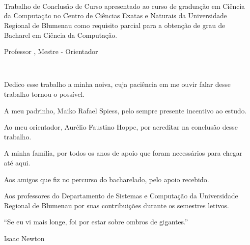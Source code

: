 \documentclass[notes.tex]{subfiles}
\renewcommand{\imprimircapa}{

    \DoubleSpacing

    \begin{centering}

        {\bfseries \MakeUppercase{\imprimirinstituicao}\par}
    
        \vspace*{\fill} \vspace*{\fill} \vspace*{\fill} \vspace*{\fill}
        \vspace*{\fill} \vspace*{\fill} \vspace*{\fill}
    
        \bfseries\LARGE\MakeUppercase{\imprimirtitulo}\\
    
        \vspace*{\fill}

        \begin{flushright}
            \bfseries \MakeUppercase{\imprimirautor}
        \end{flushright}   

        \vspace*{\fill} \vspace*{\fill} \vspace*{\fill} \vspace*{\fill}
        \vspace*{\fill} \vspace*{\fill}

        \SingleSpace

        {\bfseries \MakeUppercase{\imprimirlocal} \\ \MakeUppercase{\imprimirdata} }
        \vspace*{\fill}

    \end{centering}
    \pdfbookmark[0]{Capa}{}
    \pagebreak
}
\renewcommand{\imprimirfolhaderosto}{

    \SingleSpace
    \begin{centering}

        {\bfseries \MakeUppercase{\imprimirautor}\par}
    
        \vspace*{\fill} \vspace*{\fill}
    
        {\bfseries\LARGE\MakeUppercase{\imprimirtitulo}}\\
    
        \vspace*{\fill}

        \begin{flushright}
            \parbox{0.5\textwidth}{%
                Trabalho de Conclusão de Curso apresentado ao curso de graduação em Ciência da Computação no Centro de Ciências Exatas e Naturais da Universidade Regional de Blumenau como requisito parcial para a obtenção de grau de Bacharel em Ciência da Computação.
            }
        \end{flushright}   

        \begin{flushright}
            \parbox{\textwidth*3/5}{%
                Professor \imprimirorientador, Mestre - Orientador
            }
        \end{flushright}   

        \vspace*{\fill} \vspace*{\fill} \vspace*{\fill}
        \vspace*{\fill} \vspace*{\fill} \vspace*{\fill}

        {\bfseries \MakeUppercase{\imprimirlocal} \\ \MakeUppercase{\imprimirdata} }

    \end{centering}
    \pagebreak
}
\newcommand{\imprimirfolhadeassinaturas}{
    
}
\begin{document}
\imprimircapa

\imprimirfolhaderosto

\imprimirfolhadeassinaturas

\begin{dedicatoria}
    \vspace*{\fill}
    \hfill
    \parbox{0.5\textwidth}{%
        Dedico esse trabalho a minha noiva, cuja paciência em me ouvir falar desse trabalho tornou-o possível.
    }
    \vspace*{\fill}
\end{dedicatoria}
\pagebreak

\DoubleSpacing
\begin{agradecimentos}
    A meu padrinho, Maiko Rafael Spiess, pelo sempre presente incentivo ao estudo.

    Ao meu orientador, Aurélio Faustino Hoppe, por acreditar na conclusão desse trabalho.

    A minha família, por todos os anos de apoio que foram necessários para chegar até aqui.

    Aos amigos que fiz no percurso do bacharelado, pelo apoio recebido.

    Aos professores do Departamento de Sistemas e Computação da Universidade Regional de Blumenau por suas contribuições durante os semestres letivos.
\end{agradecimentos}
\pagebreak

\SingleSpace
\begin{epigrafe}
    \vspace*{\fill}

    \hfill
    \parbox{0.51\textwidth}{%
    ``Se eu vi mais longe, foi por estar sobre ombros de gigantes.''
    }

    \begin{flushright}
    Isaac Newton
    \end{flushright}
    \vspace*{\fill}
\end{epigrafe}
\end{document}
